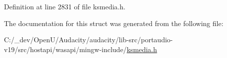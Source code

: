 Definition at line 2831 of file ksmedia.\+h.



The documentation for this struct was generated from the following file\+:\begin{DoxyCompactItemize}
\item 
C\+:/\+\_\+dev/\+Open\+U/\+Audacity/audacity/lib-\/src/portaudio-\/v19/src/hostapi/wasapi/mingw-\/include/\hyperlink{ksmedia_8h}{ksmedia.\+h}\end{DoxyCompactItemize}
